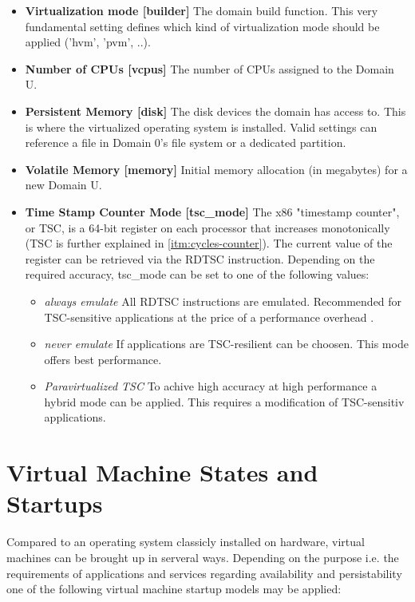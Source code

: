 \begin{itemize}
	\item \textbf{Virtualization mode [\textsf{builder}]} The domain build function. This very fundamental setting defines which kind of virtualization mode should be applied ('hvm', 'pvm', ..).
	\item \textbf{Number of CPUs [\textsf{vcpus}]} The number of CPUs assigned to the Domain U.
	
	\item \textbf{Persistent Memory [\textsf{disk}]} The disk devices the domain has access to. This is where the virtualized operating system is installed. Valid settings can reference a file in Domain 0's file system or a dedicated partition.

	\item \textbf{Volatile Memory [\textsf{memory}]} Initial memory allocation (in megabytes) for a new Domain U.

	\item \textbf{Time Stamp Counter Mode [\textsf{tsc\_mode}]} The x86 "timestamp counter", or TSC, is a 64-bit register on each processor that increases monotonically \cite{xentscmode} (TSC is further explained in \ref{itm:cycles-counter}). The current value of the register can be retrieved via the \textsf{RDTSC} instruction. Depending on the required accuracy, \textsf{tsc\_mode} can be set to one of the following values:
	\begin{itemize}
		\item \textit{always emulate} All \textsf{RDTSC} instructions are emulated. Recommended for TSC-sensitive applications at the price of a performance overhead \cite{xentscmode}.
		\item \textit{never emulate} If applications are TSC-resilient can be choosen. This mode offers best performance.
		\item \textit{Paravirtualized TSC} To achive high accuracy at high performance a hybrid mode can be applied. This requires a modification of TSC-sensitiv applications.
	\end{itemize}
\end{itemize}


\section{Virtual Machine States and Startups}
Compared to an operating system classicly installed on hardware, virtual machines can be brought up in serveral ways. Depending on the purpose i.e. the requirements of applications and services regarding availability and persistability one of the following virtual machine startup models may be applied:

